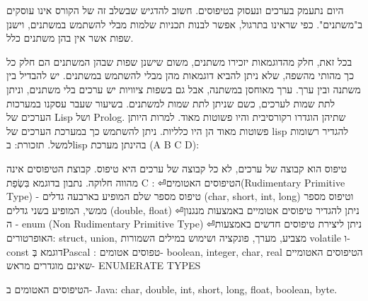 \begin{טבלא}[!htbp]
      היום נתעמק בערכים ונעסוק בטיפוסים. חשוב להדגיש שבשלב זה של הקורס אינו עוסקים
      ב"משתנים". כפי שראינו בתרגול, אפשר לבנות תכניות שלמות מבלי להשתמש במשתנים,
      וישנן שפות אשר אין בהן משתנים כלל.

      בכל זאת, חלק מהדוגמאות יזכירו משתנים, משום שישנן שפות שבהן המשתנים הם חלק כל כך
      מהותי מהשפה, שלא ניתן להביא דוגמאות מהן מבלי להשתמש במשתנים. יש להבדיל בין
      משתנה ובין ערך. ערך מאוחסן במשתנה, אבל גם בשפות ציוויות יש ערכים בלי משתנים,
      וניתן לתת שמות לערכים, כשם שניתן לתת שמות למשתנים. בשיעור שעבר עסקנו במערכות
      הערכים של Lisp ושל Prolog. שתיהן הוגדרו רקורסיבית והיו פשוטות מאוד. למרות היותן
      פשוטות מאוד הן היו כלליות. ניתן להשתמש כך במערכת הערכים של lisp להגדיר רשומות
      למשל.
      תזכורת: בlisp בהינתן מערכת (A B C D):

      טיפוס הוא קבוצה של ערכים, לא כל קבוצה של ערכים היא טיפוס. קבוצת הטיפוסים אינה
      מהווה חלוקה.
      נתבון בדוגמא בִּשְׂפַת C :
⏎הטיפוסים האטומים(Rudimentary Primitive Type)
      - טיפוס מספר שלם המופיע בארבעה גדלים (char,
      short, int, long) וטיפוס מספר ממשי, המופיע
      בשני גדלים (double, float)
⏎ניתן להגדיר טיפוסים אטומיים באמצעות מנגנון ה
      - enum (Non Rudimentary Primitive Type)
⏎ניתן ליצירת טיפוסים חדשים באמצעות האופרטורים: struct, union, מצביע, מערך, פונקציה ושימוש במילים השמורות volatile ו- const
      דוגמא בְּPascal :
      טפוסים אטומים- boolean, integer, char, real
      הטיפוסים האטומיים שאינם מוגדרים מראש- ENUMERATE TYPES

      הטיפוסים האטומים ב- Java:
      char, double, int, short, long, float, boolean, byte.


\end{טבלא}
